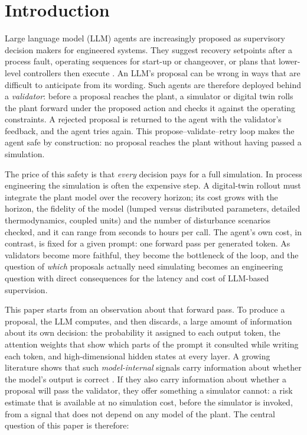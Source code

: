 \section{Introduction}\label{sec:intro}

Large language model (LLM) agents are increasingly proposed as supervisory decision makers for engineered systems.
They suggest recovery setpoints after a process fault, operating sequences for start-up or changeover, or plans
that lower-level controllers then execute
\citep{yao2023react,shinn2023reflexion,decardinelson2024genai,vyas2024agentic,car_todo}. An LLM's proposal can
be wrong in ways that are difficult to anticipate from its wording. Such agents are therefore deployed behind a
\emph{validator}: before a proposal reaches the plant, a simulator or digital twin \citep{tao2019digitaltwin}
rolls the plant forward under the proposed action and checks it against the operating constraints. A rejected
proposal is returned to the agent with the validator's feedback, and the agent tries again. This
propose--validate--retry loop makes the agent safe by construction: no proposal reaches the plant without having
passed a simulation.

The price of this safety is that \emph{every} decision pays for a full simulation. In process engineering the
simulation is often the expensive step. A digital-twin rollout must integrate the plant model over the recovery
horizon; its cost grows with the horizon, the fidelity of the model (lumped versus distributed parameters,
detailed thermodynamics, coupled units) and the number of disturbance scenarios checked, and it can range from
seconds to hours per call. The agent's own cost, in contrast, is fixed for a given prompt: one forward pass per
generated token. As validators become more faithful, they become the bottleneck of the loop, and the question
of \emph{which} proposals actually need simulating becomes an engineering question with direct consequences for
the latency and cost of LLM-based supervision.

This paper starts from an observation about that forward pass. To produce a proposal, the LLM computes, and then
discards, a large amount of information about its own decision: the probability it assigned to each output
token, the attention weights that show which parts of the prompt it consulted while writing each token, and
high-dimensional hidden states at every layer. A growing literature shows that such \emph{model-internal}
signals carry information about whether the model's output is correct
\citep{kadavath2022know,azaria2023internal,burns2023ccs,marks2023geometry,chen2024inside,orgad2025llms,chuang2024lookback}.
If they also carry information about whether a proposal will pass the validator, they offer something a
simulator cannot: a risk estimate that is available at no simulation cost, before the simulator is invoked,
from a signal that does not depend on any model of the plant. The central question of this paper is
therefore:


